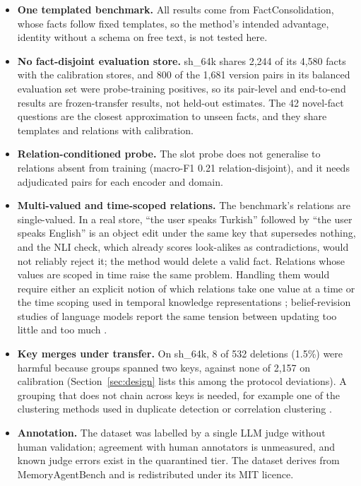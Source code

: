 \documentclass{CUP-JNL-NLP}
\newcommand{\sub}[1]{\textsf{sh\_#1}}                    %
\begin{document}
\begin{itemize}
\item \textbf{One templated benchmark.} All results come from FactConsolidation, whose facts follow fixed templates, so the method's intended advantage, identity without a schema on free text, is not tested here.
\item \textbf{No fact-disjoint evaluation store.} \sub{64k} shares 2,244 of its 4,580 facts with the calibration stores, and 800 of the 1,681 version pairs in its balanced evaluation set were probe-training positives, so its pair-level and end-to-end results are frozen-transfer results, not held-out estimates. The 42 novel-fact questions are the closest approximation to unseen facts, and they share templates and relations with calibration.
\item \textbf{Relation-conditioned probe.} The slot probe does not generalise to relations absent from training (macro-F1 0.21 relation-disjoint), and it needs adjudicated pairs for each encoder and domain.
\item \textbf{Multi-valued and time-scoped relations.} The benchmark's relations are single-valued. In a real store, ``the user speaks Turkish'' followed by ``the user speaks English'' is an object edit under the same key that supersedes nothing, and the NLI check, which already scores look-alikes as contradictions, would not reliably reject it; the method would delete a valid fact. Relations whose values are scoped in time raise the same problem. Handling them would require either an explicit notion of which relations take one value at a time or the time scoping used in temporal knowledge representations \citep{dhingra2022timeaware,rasmussen2025zep}; belief-revision studies of language models report the same tension between updating too little and too much \citep{wilie2024belief}.
\item \textbf{Key merges under transfer.} On \sub{64k}, 8 of 532 deletions (1.5\%) were harmful because groups spanned two keys, against none of 2,157 on calibration (Section~\ref{sec:design} lists this among the protocol deviations). A grouping that does not chain across keys is needed, for example one of the clustering methods used in duplicate detection or correlation clustering \citep{bansal2004correlation,hassanzadeh2009framework}.
\item \textbf{Annotation.} The dataset was labelled by a single LLM judge without human validation; agreement with human annotators is unmeasured, and known judge errors exist in the quarantined tier. The dataset derives from MemoryAgentBench and is redistributed under its MIT licence. %

\end{itemize}
\end{document}
